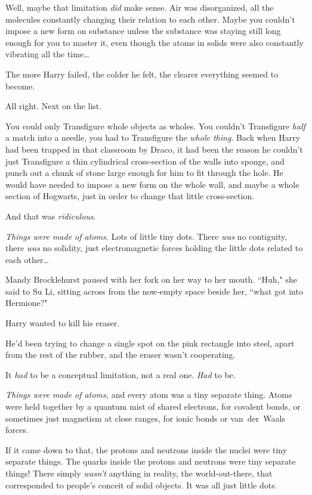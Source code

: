 Well, maybe that limitation \emph{did} make sense. Air was disorganized, all the molecules constantly changing their relation to each other. Maybe you couldn't impose a new form on substance unless the substance was staying still long enough for you to master it, even though the atoms in solids were also constantly vibrating all the time{\ldots}

The more Harry failed, the colder he felt, the clearer everything seemed to become.

All right. Next on the list.

You could only Transfigure whole objects as wholes. You couldn't Transfigure \emph{half} a match into a needle, you had to Transfigure the \emph{whole thing}. Back when Harry had been trapped in that classroom by Draco, it had been the reason he couldn't just Transfigure a thin cylindrical cross-section of the walls into sponge, and punch out a chunk of stone large enough for him to fit through the hole. He would have needed to impose a new form on the whole wall, and maybe a whole section of Hogwarts, just in order to change that little cross-section.

And that was \emph{ridiculous}.

\emph{Things were made of atoms.} Lots of little tiny dots. There \emph{was} no contiguity, there \emph{was} no solidity, just electromagnetic forces holding the little dots related to each other{\ldots}

\later

Mandy Brocklehurst paused with her fork on her way to her mouth. ``Huh," she said to Su Li, sitting across from the now-empty space beside her, ``what got into Hermione?"

\later

Harry wanted to kill his eraser.

He'd been trying to change a single spot on the pink rectangle into steel, apart from the rest of the rubber, and the eraser wasn't cooperating.

It \emph{had} to be a conceptual limitation, not a real one. \emph{Had} to be.

\emph{Things were made of atoms,} and every atom was a tiny separate thing. Atoms were held together by a quantum mist of shared electrons, for covalent bonds, or sometimes just magnetism at close ranges, for ionic bonds or van~der~Waals forces.

If it came down to that, the protons and neutrons inside the nuclei were tiny separate things. The quarks inside the protons and neutrons were tiny separate things! There simply \emph{wasn't} anything in reality, the world-out-there, that corresponded to people's conceit of solid objects. It was all just little dots.

